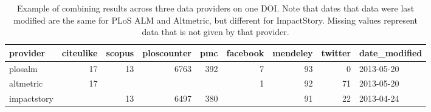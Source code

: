 \documentclass[letterpaper,superscriptaddress,showkeys,longbibliography]{revtex4-1}\usepackage{graphicx, color}
\begin{document}
\begin{table}[ht]
\centering
\begin{tabular}{lrrrrrrrl}
  \hline
provider & citeulike & scopus & ploscounter & pmc & facebook & mendeley & twitter & date\_modified \\ 
  \hline
plosalm & 17 & 13 & 6763 & 392 & 7 & 93 & 0 & 2013-05-20 \\ 
  altmetric & 17 &  &  &  & 1 & 92 & 71 & 2013-05-20 \\ 
  impactstory &  & 13 & 6497 & 380 &  & 91 & 22 & 2013-04-24 \\ 
   \hline
\end{tabular}
\caption{Example of combining results across three data providers on one DOI. Note that dates that data were last modified are the same for PLoS ALM and Altmetric, but different for ImpactStory. Missing values represent data that is not given by that provider.} 
\end{table}
\end{document}
